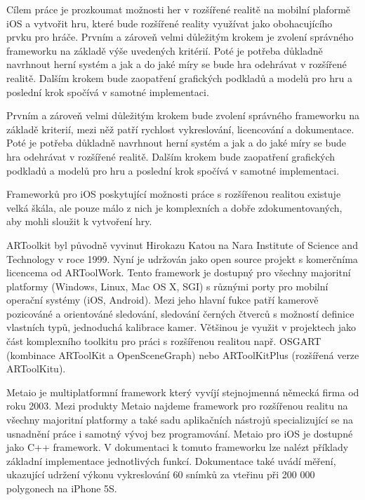 \documentclass[oneside,12pt]{article}
\begin{document}
Cílem práce je prozkoumat možnosti her v rozšířené realitě na mobilní plaformě iOS a vytvořit hru, které bude rozšířené reality využívat jako obohacujícího prvku pro hráče. Prvním a zároveň velmi důležitým krokem je zvolení správného frameworku na základě výše uvedených kritérií. Poté je potřeba důkladně navrhnout herní systém a jak a do jaké míry se bude hra odehrávat v rozšířené realitě. Dalším krokem bude zaopatření grafických podkladů a modelů pro hru a poslední krok spočívá v samotné implementaci.

Prvním a zároveň velmi důležitým krokem bude zvolení správného frameworku na základě kriterií, mezi něž patří rychlost vykreslování, licencování a dokumentace. Poté je potřeba důkladně navrhnout herní systém a jak a do jaké míry se bude hra odehrávat v rozšířené realitě. Dalším krokem bude zaopatření grafických podkladů a modelů pro hru a poslední krok spočívá v samotné implementaci.


Frameworků pro iOS poskytující možnosti práce s rozšířenou realitou existuje velká škála, ale pouze málo z nich je komplexních a dobře zdokumentovaných, aby mohli sloužit k vytvoření hry.

ARToolkit byl původně vyvinut Hirokazu Katou na Nara Institute of Science and Technology v roce 1999. Nyní je udržován jako open source projekt s komerčníma licencema od ARToolWork. Tento framework je dostupný pro všechny majoritní platformy (Windows, Linux, Mac OS X, SGI) s různými porty pro mobilní operační systémy (iOS, Android). Mezi jeho hlavní fukce patří kamerově pozicováné a orientováné sledování, sledování černých čtverců s možností definice vlastních typů, jednoduchá kalibrace kamer. Většinou je využit v projektech jako část komplexního toolkitu pro práci s rozšířenou realitou např. OSGART (kombinace ARToolKit a OpenSceneGraph) nebo ARToolKitPlus (rozšířená verze ARToolKitu).

Metaio je multiplatformní framework který vyvíjí stejnojmenná německá firma od roku 2003. Mezi produkty Metaio najdeme framework pro rozšířenou realitu na všechny majoritní platformy a také sadu aplikačních nástrojů specializující se na usnadnění práce i samotný vývoj bez programování. Metaio pro iOS je dostupné jako C++ framework. V dokumentaci k tomuto frameworku lze nalézt příklady základní implementace jednotlivých funkcí. Dokumentace také uvádí měření, ukazující udržení výkonu vykreslování 60 snímků za vteřinu při 200 000 polygonech na iPhone 5S.
\end{document}
